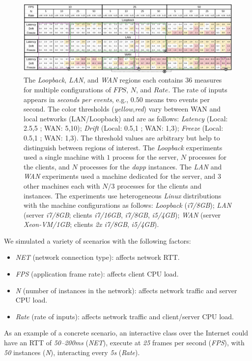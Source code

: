 \documentclass[sigplan,screen]{acmart}
\newcommand{\dapp}{\emph{dapp}\xspace}
\begin{document}
\begin{figure}[t]
  \centering
  \includegraphics[width=\linewidth]{table2}
  \caption{
    \label{fig.table}
The \emph{Loopback}, \emph{LAN}, and \emph{WAN} regions each contains $36$
measures for multiple configurations of $FPS$, $N$, and $Rate$.
The rate of inputs appears in \emph{seconds per events}, e.g., $0.50$ means two
events per second.
%
The color thresholds (\emph{yellow},\emph{red}) vary between WAN and local
networks (LAN/Loopback) and are as follows:
    \emph{Latency} (Local: 2.5,5 ; WAN: 5,10);
    \emph{Drift}   (Local: 0.5,1 ; WAN: 1,3);
    \emph{Freeze}  (Local: 0.5,1 ; WAN: 1,3).
The threshold values are arbitrary but help to distinguish between regions of
interest.
%
The \emph{Loopback} experiments used a single machine with $1$ process for the
server, $N$ processes for the clients, and $N$ processes for the \dapp
instances.
The \emph{LAN} and \emph{WAN} experiments used a machine dedicated for the
server, and $3$ other machines each with $N/3$ processes for the clients and
instances.
%
The experiments use heterogeneous \emph{Linux} distributions with the machine
configurations as follows:
    \emph{Loopback} (\emph{i7/8GB});
    \emph{LAN} (server \emph{i7/8GB}; clients \emph{i7/16GB}, \emph{i7/8GB}, \emph{i5/4GB});
    \emph{WAN} (server \emph{Xeon-VM/1GB}; clients \emph{2x i7/8GB}, \emph{i5/4GB}).
  }
\end{figure}

We simulated a variety of scenarios with the following factors:
%
\begin{itemize}
\item \emph{NET} (network connection type):
    affects network RTT.
\item \emph{FPS} (application frame rate):
    affects client CPU load.
\item \emph{N} (number of instances in the network):
    affects network traffic and server CPU load.
\item \emph{Rate} (rate of inputs):
    affects network traffic and client/server CPU load.
\end{itemize}
%

As an example of a concrete scenario, an interactive class over the Internet
could have
    an RTT of \emph{50--200ms} (\emph{NET}),
    execute at \emph{25} frames per second (\emph{FPS}),
    with \emph{50} instances (\emph{N}),
    interacting every \emph{5s} (\emph{Rate}).
\end{document}
